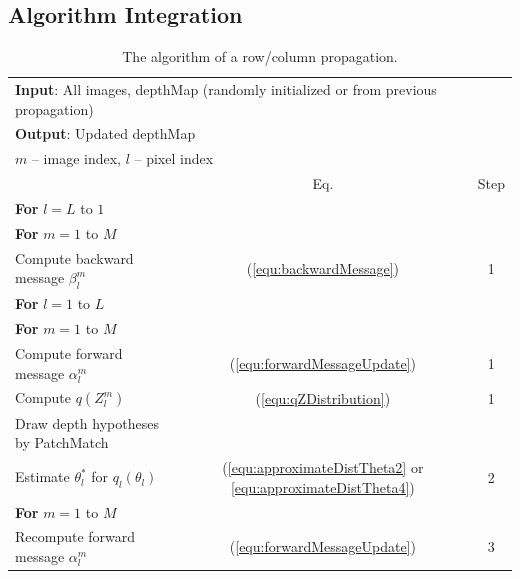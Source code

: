 \subsection{Algorithm Integration}  \label{sec:algorithm}
\begin{table}[]
    \small
    \centering
    \begin{tabular}{|l|c|c|}
        \hline
        \multicolumn{3}{|p{13.0cm}|}{{\bf Input}: All images, depthMap (randomly initialized or from previous propagation)}  \\
        \multicolumn{3}{|p{13.0cm}|}{{\bf Output}: Updated depthMap}\\
        \multicolumn{3}{|p{13.0cm}|}{$m$ -- image index, $l$ -- pixel index}\\
        \hline
            & Eq. & Step \\ \cline{2-3}
            {\bf For} $l = L$ to $1$ & &\\
                \hspace{5 mm} {\bf For} $m = 1$ to $M$  & & \\
                    \hspace{10 mm} Compute backward message $\beta_l^m$  &    (\ref{equ:backwardMessage}) &   1 \\
            {\bf For} $l = 1$ to $L$ & &\\
                \hspace{5 mm} {\bf For} $m = 1$ to $M$ & &\\
                  \hspace{10 mm} Compute forward message $\alpha_l^m$  &      (\ref{equ:forwardMessageUpdate}) & 1\\
                  \hspace{10 mm} Compute $q(Z_l^m)$                    &    (\ref{equ:qZDistribution}) & 1\\
                \hspace{5 mm} Draw depth hypotheses by PatchMatch & &\\
                \hspace{5 mm} Estimate $\theta_l^*$ for $q_l(\theta_l)$ &   (\ref{equ:approximateDistTheta2} or \ref{equ:approximateDistTheta4})& 2\\
                \hspace{5 mm} {\bf For} $m = 1$ to $M$  & &\\
                  \hspace{10 mm} Recompute forward message $\alpha_l^m$ & (\ref{equ:forwardMessageUpdate}) & 3\\
        \hline
    \end{tabular}
\caption{The algorithm of a row/column propagation.}
\label{table:algorithm}
\end{table}

